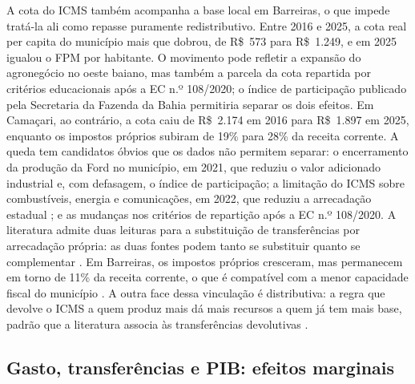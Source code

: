 A cota do ICMS também acompanha a base local em Barreiras, o que impede tratá-la ali como repasse puramente redistributivo. Entre 2016 e 2025, a cota real per capita do município mais que dobrou, de R\$~573 para R\$~1.249, e em 2025 igualou o FPM por habitante. O movimento pode refletir a expansão do agronegócio no oeste baiano, mas também a parcela da cota repartida por critérios educacionais após a EC n.º 108/2020; o índice de participação publicado pela Secretaria da Fazenda da Bahia permitiria separar os dois efeitos. Em Camaçari, ao contrário, a cota caiu de R\$~2.174 em 2016 para R\$~1.897 em 2025, enquanto os impostos próprios subiram de 19\% para 28\% da receita corrente. A queda tem candidatos óbvios que os dados não permitem separar: o encerramento da produção da Ford no município, em 2021, que reduziu o valor adicionado industrial e, com defasagem, o índice de participação; a limitação do ICMS sobre combustíveis, energia e comunicações, em 2022, que reduziu a arrecadação estadual \citep{LC194}; e as mudanças nos critérios de repartição após a EC n.º 108/2020. A literatura admite duas leituras para a substituição de transferências por arrecadação própria: as duas fontes podem tanto se substituir \citep{DaCosta2016, Taiwo202231} quanto se complementar \citep{Masaki2018173, Porto2023642}. Em Barreiras, os impostos próprios cresceram, mas permanecem em torno de 11\% da receita corrente, o que é compatível com a menor capacidade fiscal do município \citep{dosSantos2017}. A outra face dessa vinculação é distributiva: a regra que devolve o ICMS a quem produz mais dá mais recursos a quem já tem mais base, padrão que a literatura associa às transferências devolutivas \citep{daCosta2024}.

\subsection{Gasto, transferências e PIB: efeitos marginais}

